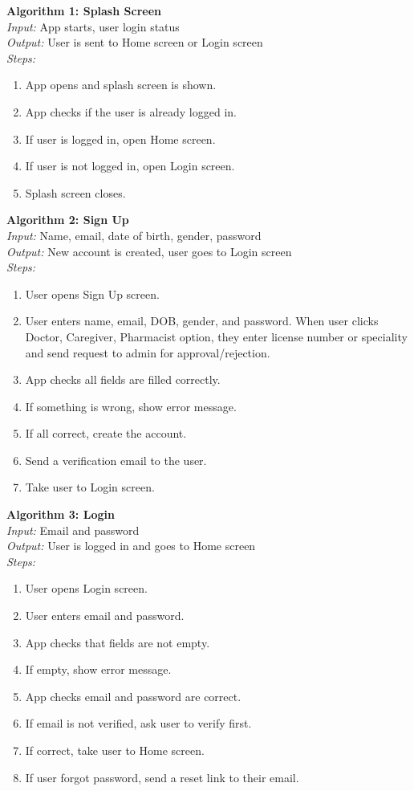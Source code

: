 
\textbf{Algorithm 1: Splash Screen}\\
\textit{Input:} App starts, user login status\\
\textit{Output:} User is sent to Home screen or Login screen\\
\textit{Steps:}
\begin{enumerate}
    \item App opens and splash screen is shown.
    \item App checks if the user is already logged in.
    \item If user is logged in, open Home screen.
    \item If user is not logged in, open Login screen.
    \item Splash screen closes.
\end{enumerate}

\textbf{Algorithm 2: Sign Up}\\
\textit{Input:} Name, email, date of birth, gender, password\\
\textit{Output:} New account is created, user goes to Login screen\\
\textit{Steps:}
\begin{enumerate}
    \item User opens Sign Up screen.
    \item User enters name, email, DOB, gender, and password. When user clicks Doctor, Caregiver, Pharmacist option, they enter license number or speciality and send request to admin for approval/rejection.
    \item App checks all fields are filled correctly.
    \item If something is wrong, show error message.
    \item If all correct, create the account.
    \item Send a verification email to the user.
    \item Take user to Login screen.
\end{enumerate}

\textbf{Algorithm 3: Login}\\
\textit{Input:} Email and password\\
\textit{Output:} User is logged in and goes to Home screen\\
\textit{Steps:}
\begin{enumerate}
    \item User opens Login screen.
    \item User enters email and password.
    \item App checks that fields are not empty.
    \item If empty, show error message.
    \item App checks email and password are correct.
    \item If email is not verified, ask user to verify first.
    \item If correct, take user to Home screen.
    \item If user forgot password, send a reset link to their email.
\end{enumerate}

